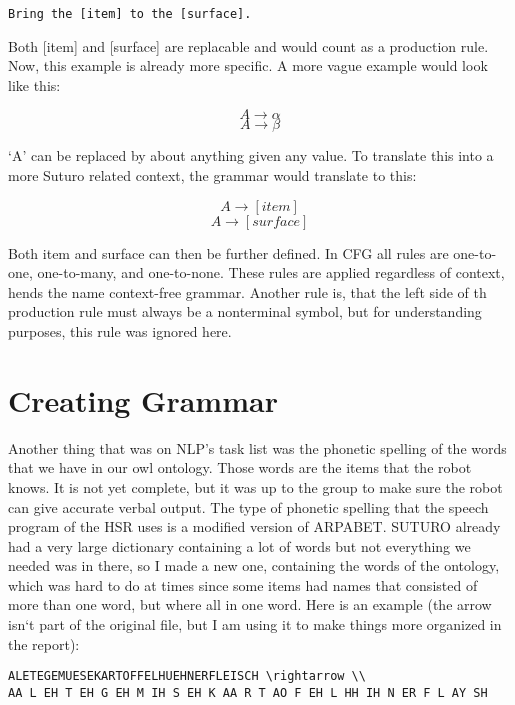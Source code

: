 \documentclass[main.tex]{subfiles}
\begin{document}
\begin{verbatim}
Bring the [item] to the [surface].
\end{verbatim}

Both [item] and [surface] are replacable and would count as a production rule. Now, this example is already more specific. A more vague example would look like this:

\begin{equation}
A \rightarrow \alpha
\end{equation}
\begin{equation}
A \rightarrow \beta
\end{equation}

‘A’ can be replaced by about anything given any value. To translate this into a more Suturo related context, the grammar would translate to this:

\begin{equation}
A \rightarrow [item]
\end{equation}
\begin{equation}
A \rightarrow [surface]
\end{equation}

Both item and surface can then be further defined. In CFG all rules are one-to-one, one-to-many, and one-to-none. These rules are applied regardless of context, hends the name context-free grammar. Another rule is, that the left side of th production rule must always be a nonterminal symbol, but for understanding purposes, this rule was ignored here.

	\section{Creating Grammar}
	Another thing that was on NLP's task list was the phonetic spelling of the words that we have in our owl ontology. Those words are the items that the robot knows. It is not yet complete, but it was up to the group to make sure the robot can give accurate verbal output. The type of phonetic spelling that the speech program of the HSR uses is a modified version of ARPABET. SUTURO already had a very large dictionary containing a lot of words but not everything we needed was  in there, so I made a new one, containing the words of the ontology, which was hard to do at times since some items had names that consisted of more than one word, but where all in one word. Here is an example (the arrow isn‘t part of the original file, but I am using it to make things more
organized in the report):

\begin{verbatim}
ALETEGEMUESEKARTOFFELHUEHNERFLEISCH \rightarrow \\
AA L EH T EH G EH M IH S EH K AA R T AO F EH L HH IH N ER F L AY SH
\end{verbatim}
	\endgroup
\end{document}
